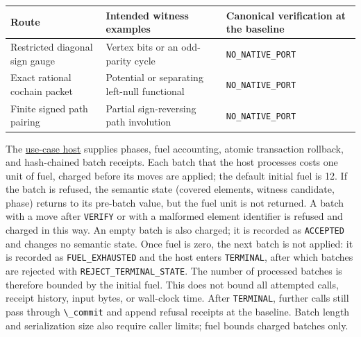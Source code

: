 \documentclass[
  11pt,
]{article}
\newcommand{\passthrough}[1]{#1}
\begin{document}
\begin{longtable}[]{@{}
  >{\raggedright\arraybackslash}p{}
  >{\raggedright\arraybackslash}p{}
  >{\raggedright\arraybackslash}p{}@{}}
\toprule\noalign{}
\begin{minipage}[b]{\linewidth}\raggedright
Route
\end{minipage} & \begin{minipage}[b]{\linewidth}\raggedright
Intended witness examples
\end{minipage} & \begin{minipage}[b]{\linewidth}\raggedright
Canonical verification at the baseline
\end{minipage} \\
\midrule\noalign{}
\endhead
\bottomrule\noalign{}
\endlastfoot
Restricted diagonal sign gauge & Vertex bits or an odd-parity cycle &
\nolinkurl{NO_NATIVE_PORT} \\
Exact rational cochain packet & Potential or separating left-null
functional & \nolinkurl{NO_NATIVE_PORT} \\
Finite signed path pairing & Partial sign-reversing path involution &
\nolinkurl{NO_NATIVE_PORT} \\
\end{longtable}

The
\href{https://github.com/dbccpage/the_symbol_game/blob/52cb5457f6c485ba548cfd292f6012a941ed22cf/omega_engine_pfp/use_cases/mssn_sn_demos/demo_3/host.py}{use-case
host} supplies phases, fuel accounting, atomic transaction rollback, and
hash-chained batch receipts. Each batch that the host processes costs
one unit of fuel, charged before its moves are applied; the default
initial fuel is 12. If the batch is refused, the semantic state (covered
elements, witness candidate, phase) returns to its pre-batch value, but
the fuel unit is not returned. A batch with a move after
\passthrough{\lstinline!VERIFY!} or with a malformed element identifier
is refused and charged in this way. An empty batch is also charged; it
is recorded as \passthrough{\lstinline!ACCEPTED!} and changes no
semantic state. Once fuel is zero, the next batch is not applied: it is
recorded as \nolinkurl{FUEL_EXHAUSTED} and the host enters
\passthrough{\lstinline!TERMINAL!}, after which batches are rejected
with \nolinkurl{REJECT_TERMINAL_STATE}. The number of processed batches
is therefore bounded by the initial fuel. This does not bound all
attempted calls, receipt history, input bytes, or wall-clock time. After
\passthrough{\lstinline!TERMINAL!}, further calls still pass through
\passthrough{\lstinline!\_commit!} and append refusal receipts at the
baseline. Batch length and serialization size also require caller
limits; fuel bounds charged batches only.
\end{document}
